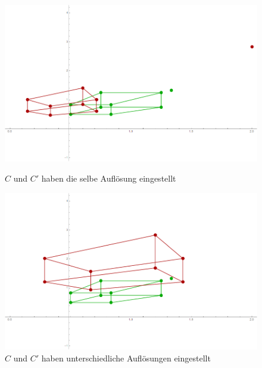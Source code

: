 \begin{figure}[!htb]
	\includegraphics[width=\linewidth]{images/Zeta1.png}
	\caption{$C$ und $C'$ haben die selbe Auflösung eingestellt}
	\label{fig:awesome_image1}
	\endminipage\hfill
	\includegraphics[width=\linewidth]{images/Zeta2.png}
	\caption{$C$ und $C'$ haben unterschiedliche Auflösungen eingestellt}
	\label{fig:awesome_image2}
	\endminipage\hfill
\end{figure}

